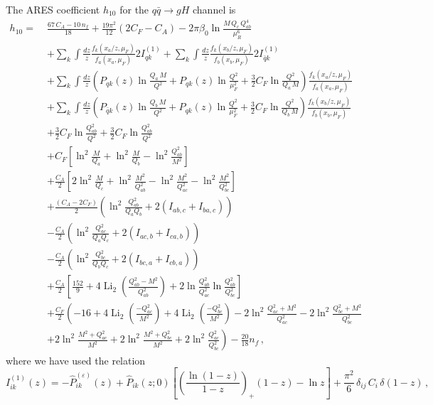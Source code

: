 The \textsc{ARES} coefficient $h_{10}$ for the $q\bar q\to g H$ channel is
\begin{equation}
\begin{aligned}
	h_{10}=\;&\frac{67\,C_A-10\,n_f}{18}
	+\frac{19\pi^2}{12}(2C_F-C_A)
	-2\pi\beta_0\ln\frac{M\,Q_c\,Q_{ab}^4}{\mu_R^6}\\[2ex]
	&+\sum_{k}\int\frac{dz}{z} \frac{f_k(x_a/z,\mu_F)}{f_a(x_a,\mu_F)}2I_{qk}^{(1)}+\sum_{k}\int\frac{dz}{z}\frac{f_k(x_b/z,\mu_F)}{f_b(x_b,\mu_F)}2I_{\bar{q}k}^{(1)}\\
	&+\sum_{k}\int\frac{dz}{z}\left(P_{qk}(z)\ln\frac{Q_a\,M}{Q^2}+P_{qk}(z)\ln\frac{Q^2}{\mu_F^2}+\frac{3}{2}C_F\ln\frac{Q^2}{Q_a\,M}\right)
    \frac{f_k(x_a/z,\mu_F)}{f_a(x_a,\mu_F)}\\
    &+\sum_{k}\int\frac{dz}{z}\left(P_{\bar{q}k}(z)\ln\frac{Q_b\,M}{Q^2}+P_{qk}(z)\ln\frac{Q^2}{\mu_F^2}+\frac{3}{2}C_F\ln\frac{Q^2}{Q_b\,M}\right)
    \frac{f_k(x_b/z,\mu_F)}{f_b(x_b,\mu_F)}\\[1ex]
	&+\frac{3}{2}C_F\ln\frac{Q_{ab}^2}{Q^2}
	+\frac{3}{2}C_F\ln\frac{Q_{ab}^2}{Q^2}\\[1ex]
	&+C_F\left[
	\ln^2\frac{M}{Q_a}
	+\ln^2\frac{M}{Q_b}
	-\ln^2\frac{Q_{ab}^2}{M^2}
	\right]
\\[1ex]
	&+\frac{C_A}{2}\left[
	2\ln^2\frac{M}{Q_c}
	+\ln^2\frac{M^2}{Q_{ab}^2}
	-\ln^2\frac{M^2}{Q_{ac}^2}
	-\ln^2\frac{M^2}{Q_{bc}^2}
	\right]\\[2ex]
	&+\frac{(C_A-2C_F)}{2}
	\left(
	\ln^2\frac{Q_{ab}^2}{Q_aQ_b}
	+2(I_{ab,c}+I_{ba,c})
	\right)\\[1ex]
	&-\frac{C_A}{2}
	\left(
	\ln^2\frac{Q_{ac}^2}{Q_aQ_c}
	+2(I_{ac,b}+I_{ca,b})
	\right)\\[1ex]
	&-\frac{C_A}{2}
	\left(
	\ln^2\frac{Q_{bc}^2}{Q_bQ_c}
	+2(I_{bc,a}+I_{cb,a})
	\right)\\
	&+\frac{C_A}{2}\left[
	\frac{152}{9}
	+4\operatorname{Li}_2\left(\frac{Q_{ab}^2-M^2}{Q_{ab}^2}\right)
	+2\ln\frac{Q_{ab}^2}{Q_{ac}^2}
	\ln\frac{Q_{ab}^2}{Q_{bc}^2}
	\right]\\[1ex]
	&+\frac{C_F}{2}\left(
	-16
	+4\operatorname{Li}_2\left(\frac{-Q_{ac}^2}{M^2}\right)
	+4\operatorname{Li}_2\left(\frac{-Q_{bc}^2}{M^2}\right)
	-2\ln^2\frac{Q_{ac}^2+M^2}{Q_{ac}^2}
	-2\ln^2\frac{Q_{bc}^2+M^2}{Q_{bc}^2}
\right.
\\[1ex]
	&\left.
	+2\ln^2\frac{M^2+Q_{ac}^2}{M^2}
	+2\ln^2\frac{M^2+Q_{bc}^2}{M^2}
	+2\ln^2\frac{Q_{ac}^2}{Q_{bc}^2}
	\right)
	-\frac{20}{18}n_f\,,
\end{aligned}
\end{equation}
where we have used the relation
\begin{equation}
\label{eq:I1-ARES}
I_{ik}^{(1)}(z) =
-\hat{P}_{ik}^{(\varepsilon)}(z)
+\hat{P}_{ik}(z;0)\!\left[
\left(\frac{\ln(1-z)}{1-z}\right)_{\!\!+}(1-z)
-\ln z\right]
+\frac{\pi^2}{6}\,\delta_{ij}\,C_i\,\delta(1-z)\,,
\end{equation}

